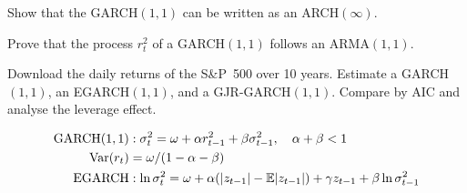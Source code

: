 \begin{exercise}[$\star\star$]
Show that the GARCH$(1,1)$ can be written as an ARCH$(\infty)$.
\end{exercise}

\begin{exercise}[$\star\star$]
Prove that the process $r_t^2$ of a GARCH$(1,1)$ follows an ARMA$(1,1)$.
\end{exercise}

\begin{exercise}
Download the daily returns of the S\&P~500 over 10 years. Estimate a GARCH$(1,1)$, an EGARCH$(1,1)$, and a GJR-GARCH$(1,1)$. Compare by AIC and analyse the leverage effect.
\end{exercise}

\begin{keyformulas}
\begin{align*}
\text{GARCH}(1,1) &: \sigma_t^2 = \omega+\alpha r_{t-1}^2+\beta\sigma_{t-1}^2, \quad \alpha+\beta<1 \\
\operatorname{Var}(r_t) &= \omega/(1-\alpha-\beta) \\
\text{EGARCH} &: \ln\sigma_t^2 = \omega+\alpha(|z_{t-1}|-\mathbb{E}|z_{t-1}|)+\gamma z_{t-1}+\beta\ln\sigma_{t-1}^2
\end{align*}
\end{keyformulas}
